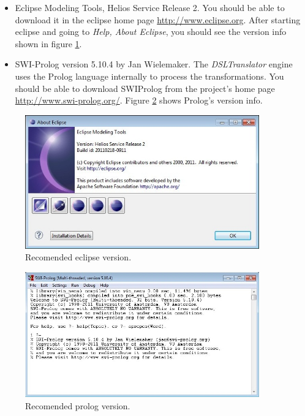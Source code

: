 \begin{itemize}
  \item Eclipse Modeling Tools, Helios Service Release 2. You should be able to
  download it in the eclipse home page \url{http://www.eclipse.org}. After
  starting eclipse and going to \emph{Help, About Eclipse}, you should see the
  version info shown in figure \ref{fig:rec_eclipse_version}.
  \item SWI-Prolog version 5.10.4 by Jan Wielemaker. The \emph{DSLTranslator}
  engine uses the Prolog language internally to process the transformations. You should
  be able to download SWIProlog from the project's home page
  \url{http://www.swi-prolog.org/}. Figure \ref{fig:rec_prolog_version} shows
  Prolog's version info.
\end{itemize}


\begin{figure}[H]
\begin{center}
  \includegraphics[width=0.9\textwidth]{imgs/eclipse_version.jpg}
  \caption{Recomended eclipse version.}
  \label{fig:rec_eclipse_version}
\end{center}
\end{figure}

\begin{figure}[H]
\begin{center}
  \includegraphics[width=0.9\textwidth]{imgs/prolog_version.jpg}
  \caption{Recomended prolog version.}
  \label{fig:rec_prolog_version}
\end{center}
\end{figure}


